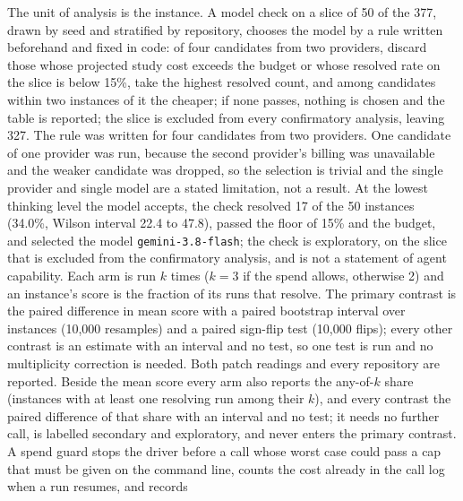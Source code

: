 \documentclass[10pt,twocolumn]{article}
\makeatletter
\renewcommand\paragraph{\@startsection{paragraph}{4}{\z@}{3pt}{-0.5em}{\normalfont\bfseries}}
\makeatother
\begin{document}
\paragraph{Analysis plan and power.} The unit of analysis is the instance. A model check on a slice of 50 of the 377, drawn by seed and
stratified by repository, chooses the model by a rule written beforehand and fixed in code: of four candidates from two providers, discard those whose projected study cost
exceeds the budget or whose resolved rate on the slice is below 15\%, take the highest resolved count, and among candidates within two instances of it the cheaper;
if none passes, nothing is chosen and the table is reported; the slice is excluded from every confirmatory analysis, leaving 327. %
The rule was written for four candidates from two providers. One candidate of one provider was run, because the second provider's billing was unavailable and the weaker candidate was dropped, so
the selection is trivial and the single provider and single model are a stated limitation, not a result. At the lowest thinking level the model accepts, the check resolved 17 of the 50 instances (34.0\%, Wilson interval 22.4 to 47.8),
passed the floor of 15\% and the budget, and selected the model \texttt{gemini-3.8-flash}; the check is exploratory, on the slice that is excluded from the confirmatory analysis, and is not a statement of agent capability. %
Each arm is run $k$ times ($k=3$ if the spend allows, otherwise 2) and an instance's score is the fraction of its runs that resolve. The primary contrast is
the paired difference in mean score with a paired bootstrap interval over instances (10,000 resamples) and a paired sign-flip test (10,000 flips); every other
contrast is an estimate with an interval and no test, so one test is run and no multiplicity correction is needed. Both patch readings and
every repository are reported. %
Beside the mean score every arm also reports the any-of-$k$ share (instances with at least one resolving run among their $k$), and every contrast the
paired difference of that share with an interval and no test; it needs no further call, is labelled secondary and exploratory, and never enters the
primary contrast. %
A spend guard stops the driver before a call whose worst case could pass a cap that must be given on the command line, counts the cost already in the call log when a run resumes, and records
\end{document}
